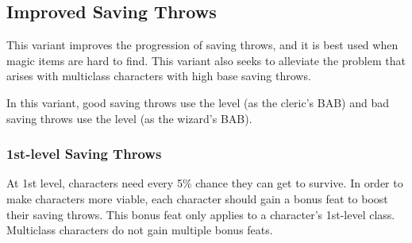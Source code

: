 \subsection{Improved Saving Throws}
This variant improves the progression of saving throws, and it is best used when magic items are hard to find. This variant also seeks to alleviate the problem that arises with multiclass characters with high base saving throws.

In this variant, good saving throws use \threequarters the level (as the cleric's BAB) and bad saving throws use \onehalf the level (as the wizard's BAB).


\subsubsection{1st-level Saving Throws}
At 1st level, characters need every 5\% chance they can get to survive. In order to make characters more viable, each character should gain a bonus feat to boost their saving throws. This bonus feat only applies to a character's 1st-level class. Multiclass characters do not gain multiple bonus feats.

